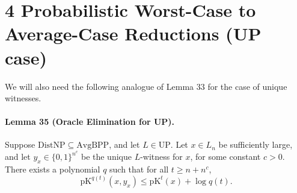 \section*{4 Probabilistic Worst-Case to Average-Case Reductions (UP case)}
We will also need the following analogue of Lemma 33 for the case of unique witnesses.
\paragraph{Lemma 35 (Oracle Elimination for UP).} Suppose $\mathrm{DistNP}\subseteq\mathrm{AvgBPP}$, and let $L\in\mathrm{UP}$. Let $x\in L_n$ be sufficiently large, and let $y_x\in\{0,1\}^{n^c}$ be the unique $L$-witness for $x$, for some constant $c>0$. There exists a polynomial $q$ such that for all $t\geq n+n^c$,
\[\mathrm{pK}^{q(t)}(x,y_x)\leq\mathrm{pK}^t(x)+\log q(t).\]
